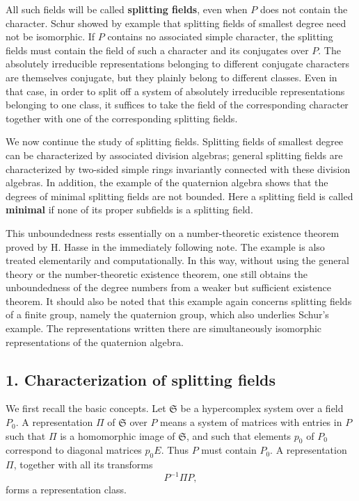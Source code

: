 \documentclass[
  12pt,
]{article}
\begin{document}
All such fields will be called \textbf{splitting fields}, even when
\(P\) does not contain the character. Schur showed by example that
splitting fields of smallest degree need not be isomorphic. If \(P\)
contains no associated simple character, the splitting fields must
contain the field of such a character and its conjugates over \(P\). The
absolutely irreducible representations belonging to different conjugate
characters are themselves conjugate, but they plainly belong to
different classes. Even in that case, in order to split off a system of
absolutely irreducible representations belonging to one class, it
suffices to take the field of the corresponding character together with
one of the corresponding splitting fields.

We now continue the study of splitting fields. Splitting fields of
smallest degree can be characterized by associated division algebras;
general splitting fields are characterized by two-sided simple rings
invariantly connected with these division algebras. In addition, the
example of the quaternion algebra shows that the degrees of minimal
splitting fields are not bounded. Here a splitting field is called
\textbf{minimal} if none of its proper subfields is a splitting field.

This unboundedness rests essentially on a number-theoretic existence
theorem proved by H. Hasse in the immediately following note. The
example is also treated elementarily and computationally. In this way,
without using the general theory or the number-theoretic existence
theorem, one still obtains the unboundedness of the degree numbers from
a weaker but sufficient existence theorem. It should also be noted that
this example again concerns splitting fields of a finite group, namely
the quaternion group, which also underlies Schur's example. The
representations written there are simultaneously isomorphic
representations of the quaternion algebra.

\subsection{1. Characterization of splitting
fields}\label{characterization-of-splitting-fields}

We first recall the basic concepts. Let \(\mathfrak S\) be a
hypercomplex system over a field \(P_0\). A representation \(\Pi\) of
\(\mathfrak S\) over \(P\) means a system of matrices with entries in
\(P\) such that \(\Pi\) is a homomorphic image of \(\mathfrak S\), and
such that elements \(p_0\) of \(P_0\) correspond to diagonal matrices
\(p_0E\). Thus \(P\) must contain \(P_0\). A representation \(\Pi\),
together with all its transforms \[
  P^{-1}\Pi P,
\] forms a representation class.
\end{document}
